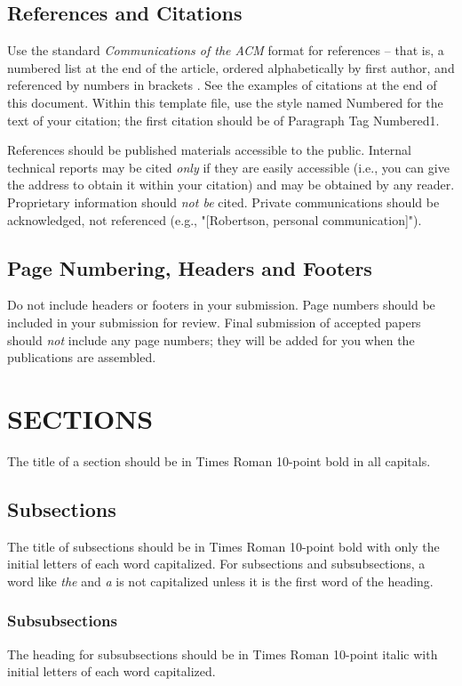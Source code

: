 \subsection{References and Citations}
Use the standard {\it Communications of the ACM} format for 
references -- that is, a numbered list at the end of the 
article, ordered alphabetically by first author, and referenced 
by numbers in brackets \cite{Anderson:Impacts}. See the examples of citations at 
the end of this document. Within this template file, use the 
style named Numbered for the text of your citation; the first 
citation should be of Paragraph Tag Numbered1.

References should be published materials accessible to the 
public. Internal technical reports may be cited {\it only} if they 
are easily accessible (i.e., you can give the address to obtain 
it within your citation) and may be obtained by any reader. 
Proprietary information should {\it not be} cited. Private 
communications should be acknowledged, not referenced 
(e.g., "[Robertson, personal communication]").

\subsection{Page Numbering, Headers and Footers}
Do not include headers or footers in your submission. Page 
numbers should be included in your submission for review. 
Final submission of accepted papers should {\it not} include any 
page numbers; they will be added for you when the 
publications are assembled.

\section{SECTIONS}
The title of a section should be in Times Roman 10-point 
bold in all capitals.

\subsection{Subsections}
The title of subsections should be in Times Roman 10-point 
bold with only the initial letters of each word capitalized. 
For subsections and subsubsections, a word like {\it the} and {\it a} 
is not capitalized unless it is the first word of the heading.

\subsubsection{Subsubsections}
The heading for subsubsections should be in Times Roman 
10-point italic with initial letters of each word capitalized.
 
